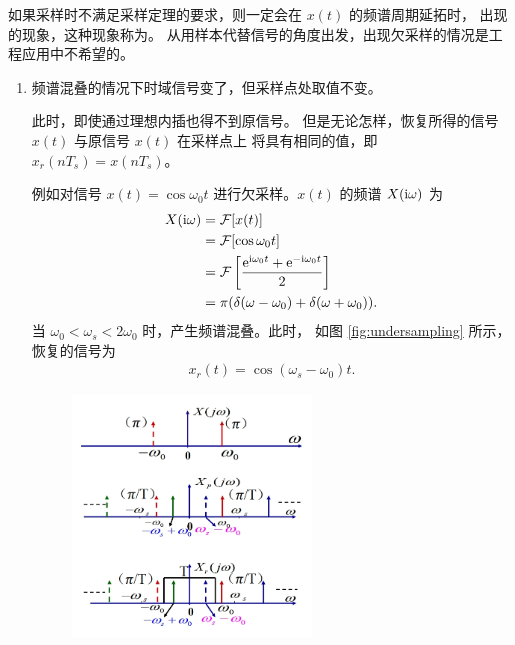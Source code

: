 \begin{definition}[欠采样]
    如果采样时不满足采样定理的要求，则一定会在 $x(t)$ 的频谱周期延拓时，
    出现的现象，这种现象称为。
    从用样本代替信号的角度出发，出现欠采样的情况是工程应用中不希望的。

    \begin{enumerate}
        \item 频谱混叠的情况下时域信号变了，但采样点处取值不变。
        
            此时，即使通过理想内插也得不到原信号。
            但是无论怎样，恢复所得的信号 $x(t)$ 与原信号 $x(t)$ 在采样点上
            将具有相同的值，即 $x_r(nT_s) = x(nT_s)$。

            例如对信号 $x(t) = \cos\omega_0 t$ 进行欠采样。$x(t)$ 的频谱 $X(\mathrm{i}\omega)$ 为
            \begin{align*}
                X(\mathrm{i}\omega) & = \mathcal{F}[x(t)] \\
                & = \mathcal{F}[\cos\omega_0 t] \\
                & = \mathcal{F}\left[\frac{\mathrm{e}^{\mathrm{i}\omega_0 t} + \mathrm{e}^{-\mathrm{i}\omega_0 t}}{2}\right] \\
                & = \pi(\delta(\omega - \omega_0) + \delta(\omega + \omega_0)).
            \end{align*}
            当 $\omega_0 < \omega_s < 2\omega_0$ 时，产生频谱混叠。此时，
            如图 \ref{fig:undersampling} 所示，
            恢复的信号为
            \begin{align*}
                x_r(t) = \cos(\omega_s - \omega_0) t.
            \end{align*}
            \begin{figure}[H]
                \centering
                \includegraphics[width=0.6\textwidth]{chap2/img/undersampling.png}

\end{figure}
\end{enumerate}
\end{definition}
